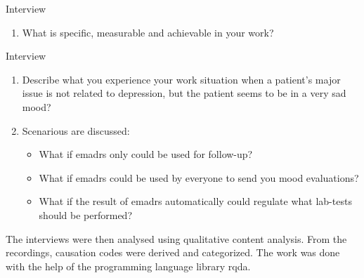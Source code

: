 \documentclass[12pt,a4paper,oneside]{article}
\let\oldcite\cite
\renewcommand*\cite[1]{\textsuperscript{\oldcite{#1}}}
\begin{document}
Interview {}\vspace{-.33em}
\begin{enumerate}[label=\sc 1.\arabic*.]
\item {\bf} What is specific, measurable and achievable in your work?
\end{enumerate}
Interview {}\vspace{-.33em}
\begin{enumerate}[label=\sc 2.\arabic*.]
\item {\bf} Describe what you experience your work situation when a patient's major issue is not related to depression, but the patient seems to be in a very sad mood? \vspace{-.33em}
\item {\bf} Scenarious are discussed:\vspace{-.33em}
\begin{itemize}\vspace{-.33em}
\item {\bf} What if e{\sc madrs} only could be used for follow-up?\vspace{-.33em}
\item {\bf} What if e{\sc madrs} could be used by everyone to send you mood evaluations?\vspace{-.33em}
\item {\bf} What if the result of e{\sc madrs} automatically could regulate what lab-tests should be performed?
\end{itemize}
\end{enumerate}
The interviews were then analysed using qualitative content analysis\cite{analysis1}. From the recordings, causation codes were derived and categorized. The work was done with the help of the programming language library {\sc rqda}\cite{rqda}.
\end{document}
